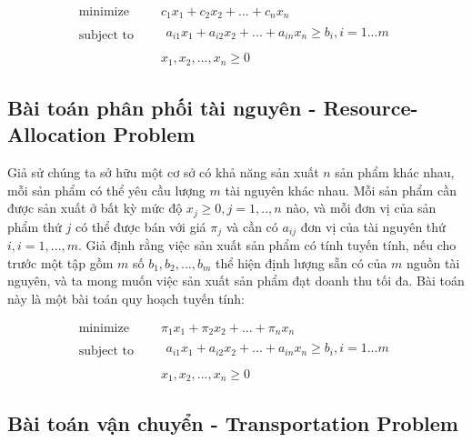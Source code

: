 \begin{equation}
    \label{eq:diet_problem}
    \begin{aligned}
        \text{minimize } \quad & c_1x_1 + c_2x_2 + ... + c_nx_n\\
        \text{subject to }\quad &
            \begin{array}{c}
            a_{i1}x_1 + a_{i2}x_2 + ... + a_{in}x_n \geq b_i, i = 1...m \\
            \end{array} \\ 
            & x_1, x_2, ..., x_n \geq 0
    \end{aligned}   
\end{equation}

\subsection{Bài toán phân phối tài nguyên - Resource-Allocation Problem}

Giả sử chúng ta sở hữu một cơ sở có khả năng sản xuất $n$ sản phẩm khác nhau, mỗi sản phẩm có thể yêu cầu lượng $m$ tài nguyên khác nhau. Mỗi sản phẩm cần được sản xuất ở bất kỳ mức độ $x_j \geq 0, j = 1,..,n$ nào, và mỗi đơn vị của sản phẩm thứ $j$ có thể được bán với giá $\pi_j$ và cần có $a_{ij}$ đơn vị của tài nguyên thứ $i, i = 1, ..., m$. Giả định rằng việc sản xuất sản phẩm có tính tuyến tính, nếu cho trước một tập gồm $m$ số $b_1, b_2, ..., b_m$ thể hiện định lượng sẵn có của $m$ nguồn tài nguyên, và ta mong muốn việc sản xuất sản phẩm đạt doanh thu tối đa. Bài toán này là một bài toán quy hoạch tuyến tính:

\begin{equation}
    \label{eq:resource_allocation_problem}
    \begin{aligned}
        \text{minimize } \quad & \pi_1x_1 + \pi_2x_2 + ... + \pi_nx_n\\
        \text{subject to }\quad &
            \begin{array}{c}
            a_{i1}x_1 + a_{i2}x_2 + ... + a_{in}x_n \geq b_i, i = 1...m \\
            \end{array} \\ 
            & x_1, x_2, ..., x_n \geq 0
    \end{aligned}   
\end{equation}

\subsection{Bài toán vận chuyển - Transportation Problem}

